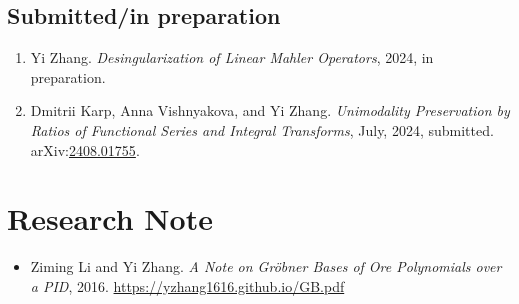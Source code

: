\documentclass[a4paper,12pt]{article}
\begin{document}
\subsection*{Submitted/in preparation}
\begin{enumerate}
\item Yi Zhang. 
{\em Desingularization of Linear Mahler Operators}, 2024, in preparation.
\item  Dmitrii Karp, Anna Vishnyakova, and Yi Zhang. {\em Unimodality Preservation by Ratios of Functional Series and Integral Transforms}, July, 2024, submitted. \\
arXiv:\href{https://arxiv.org/abs/2408.01755}{2408.01755}. 

\end{enumerate}

\section*{\Large{Research Note}}
\begin{itemize}
 \item Ziming Li and Yi Zhang. {\em A Note on Gr\"{o}bner Bases of Ore Polynomials over a PID}, 2016. 
 \url{https://yzhang1616.github.io/GB.pdf} 
\end{itemize}
\end{document}
